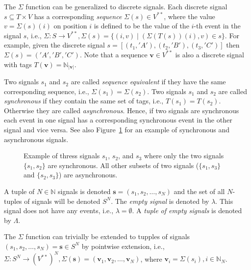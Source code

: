 The $\Sigma$ function can be generalized to discrete signals.
Each discrete signal $s \subseteq T \times V$ has a corresponding \emph{sequence} $\Sigma(s) \in V^{**}$,
where the value $v = \Sigma(s)(i)$ on position $i$ is defined to be the value
of the $i$-th event in the signal $s$, i.e.,  $\Sigma : S \to V^{**}, \Sigma(s) = \{(i,v) \mid (\Sigma(T(s))(i),v) \in s\}$.
For example, given the discrete signal $s = [(t_1,'A'),(t_2,'B'),(t_3,'C')]$ then
$\Sigma(s) = ('A','B','C')$. Note that a sequence $\mathbf{v} \in V^{**}$ is also a discrete signal with tags
$T(\mathbf{v}) = \mathbb{N}_{|\mathbf{v}|}$.

Two signals $s_1$ and $s_2$ are called \emph{sequence equivalent} if they
have the same corresponding sequence, i.e., $\Sigma(s_1) = \Sigma(s_2)$.
Two signals $s_1$ and $s_2$ are called \emph{synchronous} if they contain
the same set of tags, i.e., $T(s_1) = T(s_2)$. Otherwise they are
called \emph{asynchronous}.
Hence, if two signals are synchronous each event in one
signal has a corresponding synchronous event in the other signal and vice versa.
See also Figure~\ref{fig:example-synchronous-signals} for an
example of synchronous and asynchronous signals.

\begin{figure}
\centering

\caption{\label{fig:example-synchronous-signals}Example of thress signals
  $s_1$, $s_2$, and $s_3$ where only the two signals $\{s_1,s_2\}$ are synchronous.
  All other subsets of two signals ($\{s_1,s_3\}$ and $\{s_2,s_3\}$) are asynchronous.}
\end{figure}

A tuple of $N \in \mathbb{N}$ signals is denoted $\mathbf{s} = (s_1, s_2, \dots, s_N)$ and the
set of all $N$-tuples of signals will be denoted $S^N$.
The \emph{empty signal} is denoted by $\lambda$. This
signal does not have any events, i.e., $\lambda = \emptyset$. A \emph{tuple
of empty signals} is denoted by $\Lambda$.

The $\Sigma$ function can trivially be extended to tupples of signals
$(s_1,s_2,\ldots,s_N) = \mathbf{s} \in S^N$ by pointwise extension,
i.e., $\Sigma : S^N \to (V^{**})^N, \Sigma(\mathbf{s}) = (\mathbf{v}_1, \mathbf{v}_2,\ldots,\mathbf{v}_N)$,
where $\mathbf{v}_i = \Sigma(s_i), i \in \mathbb{N}_N$.

